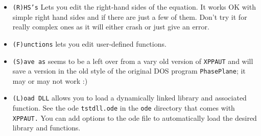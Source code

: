 \documentclass{article}
\begin{document}
\begin{itemize}
\begin{itemize}
\item {\tt (R)HS's} Lets you edit the right-hand sides of the equation. It works OK with simple right hand sides and if there are just a few of them. Don't try it for really complex ones as it will either crash or just give an error.
\item {\tt (F)unctions} lets you edit user-defined functions.
\item {\tt (S)ave as} seems to be a left over from a vary old version of {\tt XPPAUT} and will save a version in the old style of the original DOS program {\tt PhasePlane}; it may or may not work :)
\item {\tt (L)oad DLL} allows you to load a dynamically linked library and associated function. See the ode {\tt tstdll.ode} in the {\tt ode} directory that comes with {\tt XPPAUT.}  You can add options to the ode file to automatically load the desired library and functions.    
\end{itemize}


\end{itemize}
\end{document}
